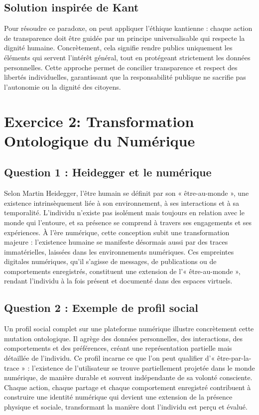 \documentclass[12pt,a4paper]{report}
\begin{document}
	\subsection*{ Solution inspirée de Kant}
	Pour résoudre ce paradoxe, on peut appliquer l'éthique kantienne : chaque action de transparence doit être guidée par un principe universalisable qui respecte la dignité humaine. Concrètement, cela signifie rendre publics uniquement les éléments qui servent l'intérêt général, tout en protégeant strictement les données personnelles. Cette approche permet de concilier transparence et respect des libertés individuelles, garantissant que la responsabilité publique ne sacrifie pas l'autonomie ou la dignité des citoyens.
	
	\section*{Exercice 2: Transformation Ontologique du Numérique}
	
	\subsection*{Question 1 : Heidegger et le numérique}
Selon Martin Heidegger, l'être humain se définit par son « être-au-monde », une existence intrinsèquement liée à son environnement, à ses interactions et à sa temporalité. L'individu n'existe pas isolément mais toujours en relation avec le monde qui l'entoure, et sa présence se comprend à travers ses engagements et ses expériences. À l’ère numérique, cette conception subit une transformation majeure : l’existence humaine se manifeste désormais aussi par des traces immatérielles, laissées dans les environnements numériques. Ces empreintes digitales numériques, qu’il s’agisse de messages, de publications ou de comportements enregistrés, constituent une extension de l’« être-au-monde », rendant l’individu à la fois présent et documenté dans des espaces virtuels.
	
	\subsection*{Question 2 : Exemple de profil social}
	Un profil social complet sur une plateforme numérique illustre concrètement cette mutation ontologique. Il agrège des données personnelles, des interactions, des comportements et des préférences, créant une représentation partielle mais détaillée de l’individu. Ce profil incarne ce que l’on peut qualifier d’« être-par-la-trace » : l’existence de l’utilisateur se trouve partiellement projetée dans le monde numérique, de manière durable et souvent indépendante de sa volonté consciente. Chaque action, chaque partage et chaque comportement enregistré contribuent à construire une identité numérique qui devient une extension de la présence physique et sociale, transformant la manière dont l’individu est perçu et évalué.
	
\end{document}
